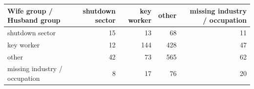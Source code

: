 
\begin{tabular}{lrrrr}
\toprule
Wife group / Husband group & shutdown sector & key worker & other & missing industry / occupation\\
\midrule
shutdown sector & 15 & 13 & 68 & 11\\
key worker & 12 & 144 & 428 & 47\\
other & 42 & 73 & 565 & 62\\
missing industry / occupation & 8 & 17 & 76 & 20\\
\bottomrule
\end{tabular}
